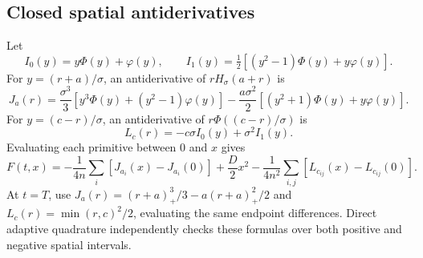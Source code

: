 \documentclass[11pt,letterpaper]{article}
\begin{document}
\subsection*{Closed spatial antiderivatives}
Let
\[
I_0(y)=y\Phi(y)+\varphi(y),\qquad
I_1(y)=\tfrac12[(y^2-1)\Phi(y)+y\varphi(y)].
\]
For $y=(r+a)/\sigma$, an antiderivative of $rH_\sigma(a+r)$ is
\begin{equation}
J_a(r)=\frac{\sigma^3}{3}[y^3\Phi(y)+(y^2-1)\varphi(y)]
-\frac{a\sigma^2}{2}[(y^2+1)\Phi(y)+y\varphi(y)].
\end{equation}
For $y=(c-r)/\sigma$, an antiderivative of $r\Phi((c-r)/\sigma)$ is
\begin{equation}
L_c(r)=-c\sigma I_0(y)+\sigma^2I_1(y).
\end{equation}
Evaluating each primitive between $0$ and $x$ gives
\begin{equation}
F(t,x)=-\frac1{4n}\sum_i[J_{a_i}(x)-J_{a_i}(0)]
+\frac D2x^2-\frac1{4n^2}\sum_{i,j}[L_{c_{ij}}(x)-L_{c_{ij}}(0)].
\end{equation}
At $t=T$, use $J_a(r)=(r+a)_+^3/3-a(r+a)_+^2/2$ and $L_c(r)=\min(r,c)^2/2$, evaluating the same endpoint differences. Direct adaptive quadrature independently checks these formulas over both positive and negative spatial intervals.
\end{document}
